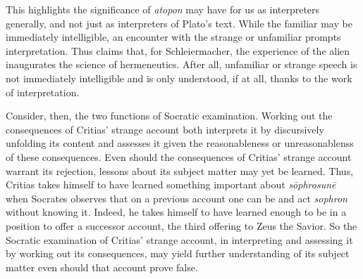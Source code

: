 This highlights the significance of \emph{atopon} may have for us as interpreters generally, and not just as interpreters of Plato's text. While the familiar may be immediately intelligible, an encounter with the strange or unfamiliar prompts interpretation. Thus \citet[186]{Gadamer:1960st} claims that, for Schleiermacher, the experience of the alien inaugurates the science of hermeneutics. After all, unfamiliar or strange speech is not immediately intelligible and is only understood, if at all, thanks to the work of interpretation.



Consider, then, the two functions of Socratic examination. Working out the consequences of Critias' strange account both interprets it by discursively unfolding its content and assesses it given the reasonableness or unreasonablenss of these consequences. Even should the consequences of Critias' strange account warrant its rejection, lessons about its subject matter may yet be learned. Thus, Critias takes himself to have learned something important about \emph{sōphrosunē} when Socrates observes that on a previous account one can be and act \emph{sophron} without knowing it. Indeed, he takes himself to have learned enough to be in a position to offer a successor account, the third offering to Zeus the Savior. So the Socratic examination of Critias' strange account, in interpreting and assessing it by working out its consequences, may yield further understanding of its subject matter even should that account prove false.

